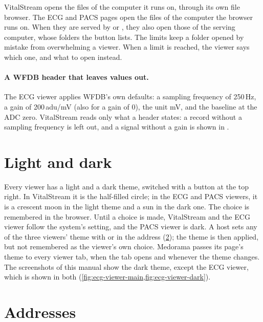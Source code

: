 VitalStream opens the files of the computer it runs on, through its own file browser. The ECG
and PACS pages open the files of the computer the browser runs on. When they are served by
 or , they also open those of the serving computer, whose
folders the button  lists. The limits keep a folder opened by mistake
from overwhelming a viewer. When a limit is reached, the viewer says which one, and what to open
instead.

\paragraph{A WFDB header that leaves values out.} The ECG viewer applies WFDB's own defaults: a
sampling frequency of 250\,Hz, a gain of 200\,adu/mV (also for a gain of 0), the unit mV, and the
baseline at the ADC zero. VitalStream reads only what a header states: a record without a
sampling frequency is left out, and a signal without a gain is shown in .

\section{Light and dark}
\label{sec:viewers-alone-themes}

Every viewer has a light and a dark theme, switched with a button at the top right. In
VitalStream it is the half-filled circle; in the ECG and PACS viewers, it is a crescent moon in
the light theme and a sun in the dark one. The choice is remembered in the browser. Until a
choice is made, VitalStream and the ECG viewer follow the system's setting, and the PACS viewer
is dark. A host sets any of the three viewers' theme with  or
 in the address (\cref{sec:viewers-alone-addresses}); the theme is then applied,
but not remembered as the viewer's own choice. Medorama passes its page's theme to every viewer
tab, when the tab opens and whenever the theme changes. The screenshots of this manual show the
dark theme, except the ECG viewer, which is shown in both (\cref{fig:ecg-viewer-main,fig:ecg-viewer-dark}).

\section{Addresses}
\label{sec:viewers-alone-addresses}

